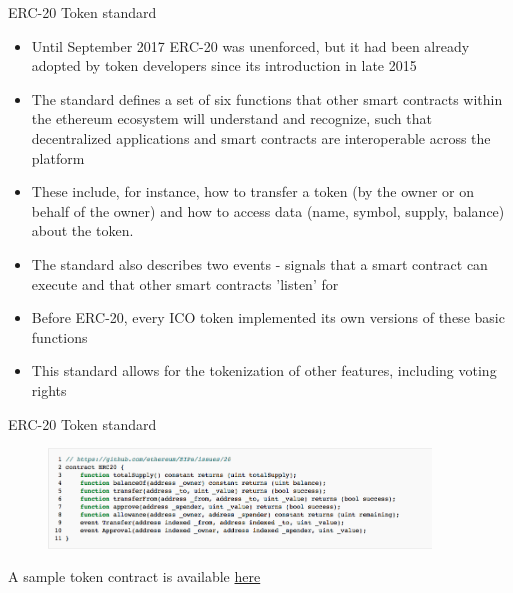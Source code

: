 \documentclass[11pt]{beamer}
\begin{document}
\begin{frame}{ERC-20 Token standard}
	\begin{small}
		\begin{itemize}
			\item Until September 2017 ERC-20 was unenforced, but it had been already adopted by token developers since its introduction in late 2015
			\item The standard defines a set of six functions that other smart contracts within the ethereum ecosystem will understand and recognize, such that decentralized applications and smart contracts are interoperable across the platform
			\item These include, for instance, how to transfer a token (by the owner or on behalf of the owner) and how to access data (name, symbol, supply, balance) about the token.
			\item The standard also describes two events - signals that a smart contract can execute and that other smart contracts 'listen' for
			\item Before ERC-20, every ICO token implemented its own versions of these basic functions
			\item This standard allows for the tokenization of other features, including voting rights
		\end{itemize}
	\end{small}
\end{frame}




\begin{frame}{ERC-20 Token standard}
	\begin{figure}[]
		\centering
		\includegraphics  [width=4in]{Images/erc20}
	\end{figure}
	\begin{scriptsize}
		A sample token contract is available \href{https://theethereum.wiki/w/index.php/ERC20_Token_Standard}{here}
	\end{scriptsize}
\end{frame}

\end{document}
